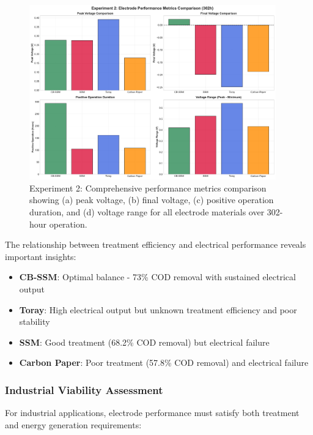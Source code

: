 \documentclass[12pt,a4paper]{article}
\begin{document}
\begin{figure}[htbp]
\centering
\includegraphics[width=0.95\textwidth]{experiment_2_performance_comparison.pdf}
\caption{Experiment 2: Comprehensive performance metrics comparison showing (a) peak voltage, (b) final voltage, (c) positive operation duration, and (d) voltage range for all electrode materials over 302-hour operation.}
\label{fig:performance_comparison_exp2}
\end{figure}

The relationship between treatment efficiency and electrical performance reveals important insights:

\begin{itemize}
    \item \textbf{CB-SSM}: Optimal balance - 73\% COD removal with sustained electrical output
    \item \textbf{Toray}: High electrical output but unknown treatment efficiency and poor stability
    \item \textbf{SSM}: Good treatment (68.2\% COD removal) but electrical failure
    \item \textbf{Carbon Paper}: Poor treatment (57.8\% COD removal) and electrical failure
\end{itemize}

\subsubsection{Industrial Viability Assessment}

For industrial applications, electrode performance must satisfy both treatment and energy generation requirements:
\end{document}
